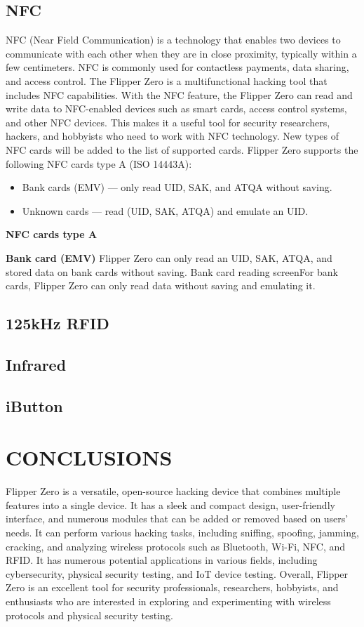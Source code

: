 \documentclass[a4paper,11pt]{report}
\begin{document}
\section{NFC}
NFC (Near Field Communication) is a technology that enables two devices to communicate with each other when they are in close proximity, typically within a few centimeters. NFC is commonly used for contactless payments, data sharing, and access control.
The Flipper Zero is a multifunctional hacking tool that includes NFC capabilities. With the NFC feature, the Flipper Zero can read and write data to NFC-enabled devices such as smart cards, access control systems, and other NFC devices. This makes it a useful tool for security researchers, hackers, and hobbyists who need to work with NFC technology. New types of NFC cards will be added to the list of supported cards. Flipper Zero supports the following NFC cards type A (ISO 14443A):
\begin{itemize}
  \item Bank cards (EMV) — only read UID, SAK, and ATQA without saving.
  \item Unknown cards — read (UID, SAK, ATQA) and emulate an UID.
\end{itemize}
\textbf{NFC cards type A}

\textbf{Bank card (EMV)} Flipper Zero can only read an UID, SAK, ATQA, and stored data on bank cards without saving. Bank card reading screenFor bank cards, Flipper Zero can only read data without saving and emulating it.

\section{125kHz RFID}
\section{Infrared}
\section{iButton}
\chapter{CONCLUSIONS}
Flipper Zero is a versatile, open-source hacking device that combines multiple features into a single device. It has a sleek and compact design, user-friendly interface, and numerous modules that can be added or removed based on users' needs. It can perform various hacking tasks, including sniffing, spoofing, jamming, cracking, and analyzing wireless protocols such as Bluetooth, Wi-Fi, NFC, and RFID. It has numerous potential applications in various fields, including cybersecurity, physical security testing, and IoT device testing. Overall, Flipper Zero is an excellent tool for security professionals, researchers, hobbyists, and enthusiasts who are interested in exploring and experimenting with wireless protocols and physical security testing.
\end{document}
